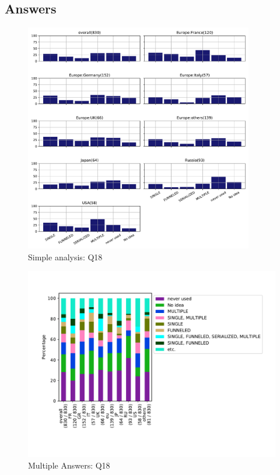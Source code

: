 
\subsection{Answers}


\begin{figure}[htb]
\begin{center}
\includegraphics[width=10cm]{../pdfs/Q18.pdf}
\caption{Simple analysis: Q18}
\label{fig:Q18}
\end{center}
\end{figure}

\begin{figure}[htb]
\begin{center}
\includegraphics[width=14cm]{../pdfs/Q18-mans.pdf}
\caption{Multiple Answers: Q18}
\label{fig:Q18-mans}
\end{center}
\end{figure}

